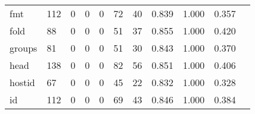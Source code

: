 \begin{longtable}{lp{1.2cm}p{1.2cm}p{1.2cm}p{1.2cm}p{1.2cm}p{1.2cm}p{1.2cm}p{1.2cm}p{1.2cm}p{1.2cm}}
fmt       &                                   112 &                                                  0 &                                                  0 &                                                  0 &                                                 72 &                                                 40 &                                         0.839 &                                              1.000 &                                              0.357 \\
fold      &                                    88 &                                                  0 &                                                  0 &                                                  0 &                                                 51 &                                                 37 &                                         0.855 &                                              1.000 &                                              0.420 \\
groups    &                                    81 &                                                  0 &                                                  0 &                                                  0 &                                                 51 &                                                 30 &                                         0.843 &                                              1.000 &                                              0.370 \\
head      &                                   138 &                                                  0 &                                                  0 &                                                  0 &                                                 82 &                                                 56 &                                         0.851 &                                              1.000 &                                              0.406 \\
hostid    &                                    67 &                                                  0 &                                                  0 &                                                  0 &                                                 45 &                                                 22 &                                         0.832 &                                              1.000 &                                              0.328 \\
id        &                                   112 &                                                  0 &                                                  0 &                                                  0 &                                                 69 &                                                 43 &                                         0.846 &                                              1.000 &                                              0.384 \\

\end{longtable}
